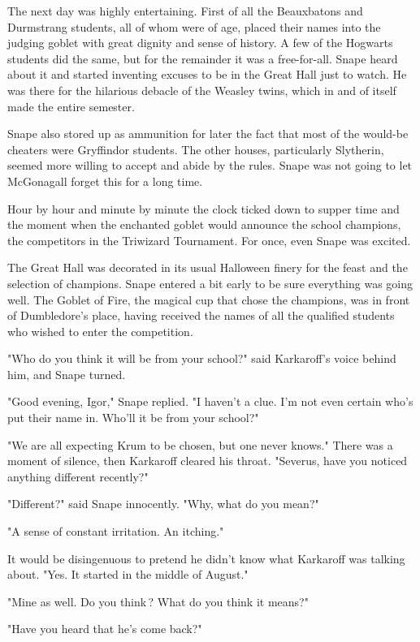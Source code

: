 The next day was highly entertaining. First of all the Beauxbatons and Durmstrang students, all of whom were of age, placed their names into the judging goblet with great dignity and sense of history. A few of the Hogwarts students did the same, but for the remainder it was a free-for-all. Snape heard about it and started inventing excuses to be in the Great Hall just to watch. He was there for the hilarious debacle of the Weasley twins, which in and of itself made the entire semester.

Snape also stored up as ammunition for later the fact that most of the would-be cheaters were Gryffindor students. The other houses, particularly Slytherin, seemed more willing to accept and abide by the rules. Snape was not going to let McGonagall forget this for a long time.

Hour by hour and minute by minute the clock ticked down to supper time and the moment when the enchanted goblet would announce the school champions, the competitors in the Triwizard Tournament. For once, even Snape was excited.

The Great Hall was decorated in its usual Halloween finery for the feast and the selection of champions. Snape entered a bit early to be sure everything was going well. The Goblet of Fire, the magical cup that chose the champions, was in front of Dumbledore's place, having received the names of all the qualified students who wished to enter the competition.

"Who do you think it will be from your school?" said Karkaroff's voice behind him, and Snape turned.

"Good evening, Igor," Snape replied. "I haven't a clue. I'm not even certain who's put their name in. Who'll it be from your school?"

"We are all expecting Krum to be chosen, but one never knows." There was a moment of silence, then Karkaroff cleared his throat. "Severus, have you noticed anything{\el} different{\el} recently?"

"Different?" said Snape innocently. "Why, what do you mean?"

"A sense of{\el} constant irritation. An itching."

It would be disingenuous to pretend he didn't know what Karkaroff was talking about. "Yes. It started in the middle of August."

"Mine as well. Do you think{\el}\,? What do you think it means?"

"Have you heard that he's come back?"

